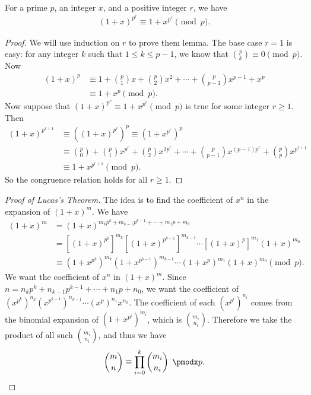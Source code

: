 \documentclass[12pt]{subfile}
\begin{document}
	\begin{lemma}
		For a prime $p$, an integer $x$, and a positive integer $r$, we have
			\begin{align*}
				(1+x)^{p^r}\equiv 1+x^{p^r}\pmod{p}.
			\end{align*}
	\end{lemma}
	
	\begin{proof}
		We will use induction on $r$ to prove them lemma. The base case $r=1$ is easy: for any integer $k$ such that $1 \leq k \leq p-1$, we know that $\binom{p}{k} \equiv 0 \pmod p$. Now
			\begin{align*}
				(1+x)^p&\equiv 1+\binom{p}{1}x+\binom{p}{2}x^2+\cdots+\binom{p}{p-1}x^{p-1}+x^p\\ &\equiv 1+x^p\pmod p.
			\end{align*}
		Now suppose that $(1+x)^{p^r}\equiv 1+x^{p^r}\pmod{p}$ is true for some integer $r \geq 1$. Then
			\begin{align*}
				(1+x)^{p^{r+1}} &\equiv\left((1+x)^{p^r}\right)^p \equiv\left(1+x^{p^r}\right)^p\\ &\equiv\binom{p}{0}+\binom{p}{1}x^{p^r}+\binom{p}{2}x^{2p^r}+\cdots+\binom{p}{p-1}x^{(p-1)p^r}+\binom{p}{p}x^{p^{r+1}}\\ &\equiv 1+x^{p^{r+1}}\pmod{p}.
			\end{align*}
		So the congruence relation holds for all $r \geq 1$.
	\end{proof}
	
	\begin{proof}[Proof of Lucas's Theorem]
		The idea is to find the coefficient of $x^n$ in the expansion of $(1+x)^m$. We have
			\begin{align*}
				(1+x)^m&=(1+x)^{m_kp^k+m_{k-1}p^{k-1}+\cdots+m_1p+m_0}\\ &=[(1+x)^{p^k}]^{m_k}[(1+x)^{p^{k-1}}]^{m_{k-1}}\cdots[(1+x)^p]^{m_1}(1+x)^{m_0}\\ &\equiv(1+x^{p^k})^{m_k}(1+x^{p^{k-1}})^{m_{k-1}}\cdots(1+x^p)^{m_1}(1+x)^{m_0}\pmod{p}.
			\end{align*}
		We want the coefficient of $x^n$ in $(1+x)^m$. Since $n=n_kp^k+n_{k-1}p^{k-1}+\cdots +n_1p+n_0$, we want the coefficient of $(x^{p^{k}})^{n_{k}}(x^{p^{k-1}})^{n_{k-1}}\cdots (x^p)^{n_1}x^{n_0}$.
		The coefficient of each $(x^{p^{i}})^{n_{i}}$ comes from the binomial expansion of $(1+x^{p^i})^{m_i}$, which is $\binom{m_i}{n_i}$. Therefore we take the product of all such $\binom{m_i}{n_i}$, and thus we have
		\begin{equation*}
		\binom{m}{n}\equiv\prod_{i=0}^{k}\binom{m_i}{n_i}\pmod{p}. \qedhere
		\end{equation*}		
	\end{proof}
	
\end{document}
